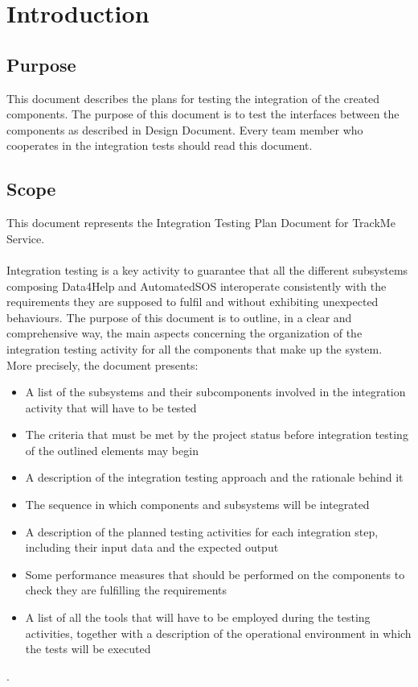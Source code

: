 \documentclass[a4paper, hidelinks, 12pt]{report}
\begin{document}
	\tableofcontents
	\newpage
	\listoffigures
	\listoftables
	\clearpage
	\setcounter{page}{1}
	
	\chapter{Introduction}
	\section{Purpose}
	This document describes the plans for testing the integration of the created components. The purpose of this document is to test the interfaces between the components as described in
Design Document. Every team member who cooperates in the integration tests should read this document.
	\section{Scope}
	This document represents the Integration Testing Plan Document for TrackMe Service. \\\\
	Integration testing is a key activity to guarantee that all the different subsystems composing Data4Help and AutomatedSOS interoperate consistently with the requirements they are supposed to fulfil and without exhibiting unexpected behaviours. The purpose of this document is to outline, in a clear and comprehensive way, the main aspects concerning the organization of the integration testing activity for all the components that make up the system.	\\	
	More precisely, the document presents:
	
\begin{itemize}
		\item{}A list of the subsystems and their subcomponents involved in the integration activity that will have to be tested
		\item{}The criteria that must be met by the project status before integration testing of the outlined elements may begin
		\item{}A description of the integration testing approach and the rationale behind it
		\item{}The sequence in which components and subsystems will be integrated
		\item{} A description of the planned testing activities for each integration step, including their input data and the expected output
		\item{}Some performance measures that should be performed on the components to check they are fulfilling the requirements
		\item{}A list of all the tools that will have to be employed during the testing activities, together with a description of the operational environment in which the tests will be executed
	\end{itemize}.
	
\end{document}
